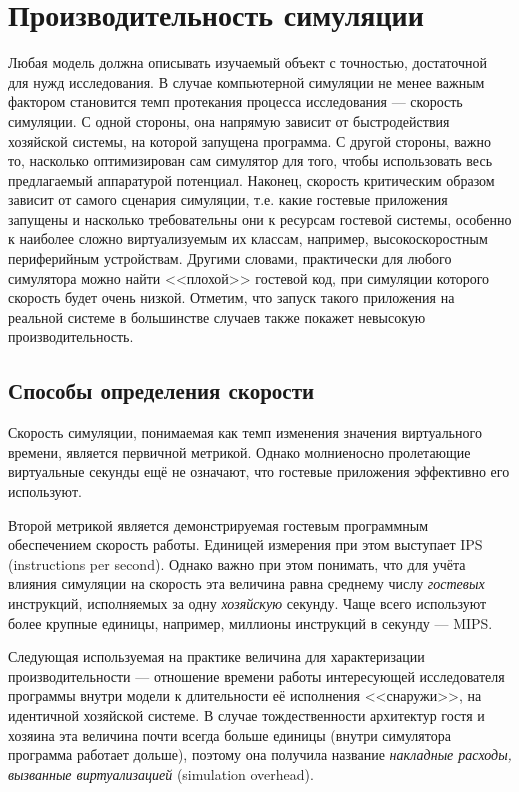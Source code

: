 \section{Производительность симуляции}


Любая модель должна описывать изучаемый объект с точностью, достаточной для нужд исследования. В случае компьютерной симуляции не менее важным фактором становится темп протекания процесса исследования --- скорость симуляции. С одной стороны, она напрямую зависит от быстродействия хозяйской системы, на которой запущена программа. С другой стороны, важно то, насколько оптимизирован сам симулятор для того, чтобы использовать весь предлагаемый аппаратурой потенциал. Наконец, скорость критическим образом зависит от самого сценария симуляции, т.е. какие гостевые приложения запущены и насколько требовательны они к ресурсам гостевой системы, особенно к наиболее сложно виртуализуемым их классам, например, высокоскоростным периферийным устройствам. Другими словами, практически для любого симулятора можно найти <<плохой>> гостевой код, при симуляции которого скорость будет очень низкой. Отметим, что запуск такого приложения на реальной системе в большинстве случаев также покажет невысокую производительность.

\subsection{Способы определения скорости}

Скорость симуляции, понимаемая как темп изменения значения виртуального времени, является первичной метрикой. Однако молниеносно пролетающие виртуальные секунды ещё не означают, что гостевые приложения эффективно его используют. 

Второй метрикой является демонстрируемая гостевым программным обеспечением скорость работы. Единицей измерения при этом выступает IPS (\abbr instructions per second). Однако важно при этом понимать, что для учёта влияния симуляции на скорость эта величина равна среднему числу \emph{гостевых} инструкций, исполняемых за одну \emph{хозяйскую} секунду. Чаще всего используют более крупные единицы, например, миллионы инструкций в секунду --- MIPS.

Следующая используемая на практике величина для характеризации производительности --- отношение времени работы интересующей исследователя программы внутри модели к длительности её исполнения <<снаружи>>, на идентичной хозяйской системе. В случае тождественности архитектур гостя и хозяина эта величина почти всегда больше единицы (внутри симулятора программа работает дольше), поэтому она получила название \textit{накладные расходы, вызванные виртуализацией} (\abbr simulation overhead). 

